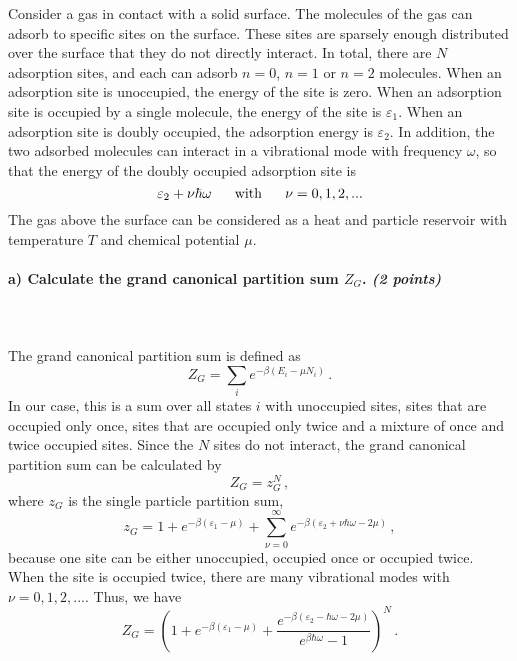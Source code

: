 Consider a gas in contact with a solid surface. The molecules of the gas 
can adsorb to specific sites on the surface. These sites are sparsely 
enough distributed over the surface that they do not directly interact. 
In total, there are $N$ adsorption sites, and each can adsorb $n=0$, 
$n=1$ or $n=2$ molecules.  When an adsorption site is unoccupied, the 
energy of the site is zero. When an adsorption site is occupied by a 
single molecule, the energy of the site is $\varepsilon_1$. When an 
adsorption site is doubly occupied, the adsorption energy is 
$\varepsilon_2$. In addition, the two adsorbed molecules can interact in 
a vibrational mode with frequency $\omega$, so that the energy of the 
doubly occupied adsorption site is
$$\varepsilon_2+\nu\hbar\omega
\ \ \ \ \ \textnormal{with}\ \ \ \ \ 
\nu=0,1,2,...$$
The gas above the surface can be considered as a heat and particle 
reservoir with temperature $T$ and chemical potential $\mu$.

\paragraph{a) Calculate the grand canonical partition sum $Z_G$. 
    \textit{(2 points)}
} \ \\
\\
    The grand canonical partition sum is defined as
    \begin{equation}
	Z_G=\sum_i e^{-\beta(E_i-\mu N_i)} \,.
    \end{equation}
    In our case, this is a sum over all states $i$ with unoccupied sites, sites
    that are occupied only once, sites that are occupied only twice and a 
    mixture of once and twice occupied sites. Since the $N$ sites do not 
    interact, the grand canonical partition sum can be calculated by
    \begin{equation}
	Z_G=z_G^N \,,
    \end{equation}
    where $z_G$ is the single particle partition sum,
    \begin{equation}
	z_G
        =1+e^{-\beta(\varepsilon_1-\mu)}+\sum_{\nu=0}^{\infty} 
	e^{-\beta(\varepsilon_2+\nu\hbar\omega-2\mu)} \,,
    \end{equation}
    because one site can be either unoccupied, occupied once or occupied
    twice. When the site is occupied twice, there are many vibrational modes
    with $\nu=0,1,2,...$. Thus, we have
    \begin{equation}
	Z_G
        =\left(
            1+e^{-\beta(\varepsilon_1-\mu)}
            +\frac{e^{-\beta(\varepsilon_2-\hbar\omega-2\mu)}}
            {e^{\beta\hbar\omega}-1}
        \right)^N \,.
    \end{equation}

